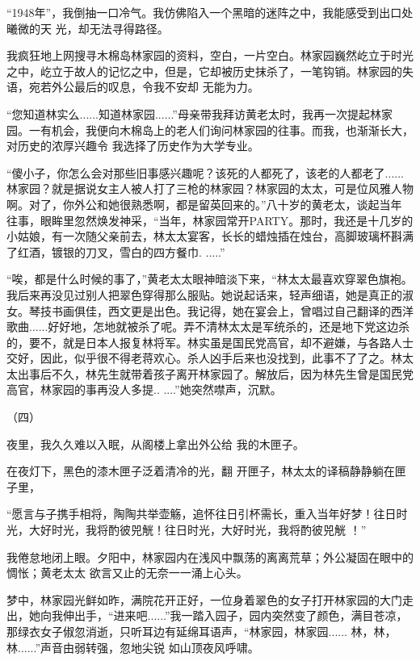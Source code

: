 \documentclass{article}
\begin{document}
\newpage

“1948年”，我倒抽一口冷气。我仿佛陷入一个黑暗的迷阵之中，我能感受到出口处曦微的天
光，却无法寻得路径。 

我疯狂地上网搜寻木棉岛林家园的资料，空白，一片空白。林家园巍然屹立于时光之中，屹立于故人的记忆之中，但是，它却被历史抹杀了，一笔钩销。林家园的失语，宛若外公最后的叹息，令我不安却
无能为力。 

“您知道林实么......知道林家园......”母亲带我拜访黄老太时，我再一次提起林家园。一有机会，我便向木棉岛上的老人们询问林家园的往事。而我，也渐渐长大，对历史的浓厚兴趣令
我选择了历史作为大学专业。 

“傻小子，你怎么会对那些旧事感兴趣呢？该死的人都死了，该老的人都老了......林家园？就是据说女主人被人打了三枪的林家园？林家园的太太，可是位风雅人物啊。对了，你外公和她很熟悉啊，都是留英回来的。”八十岁的黄老太，谈起当年
\newpage
往事，眼眸里忽然焕发神采，“当年，林家园常开PARTY。那时，我还是十几岁的小姑娘，有一次随父亲前去，林太太宴客，长长的蜡烛插在烛台，高脚玻璃杯斟满了红酒，镀银的刀叉，雪白的四方餐巾.
.....” 

“唉，都是什么时候的事了，”黄老太太眼神暗淡下来，“林太太最喜欢穿翠色旗袍。我后来再没见过别人把翠色穿得那么服贴。她说起话来，轻声细语，她是真正的淑女。琴技书画俱佳，西文更是出色。我记得，她在宴会上，曾唱过自己翻译的西洋歌曲......好好地，怎地就被杀了呢。弄不清林太太是军统杀的，还是地下党这边杀的，要不，就是日本人报复林将军。林实虽是国民党高官，却不避嫌，与各路人士交好，因此，似乎很不得老蒋欢心。杀人凶手后来也没找到，此事不了了之。林太太出事后不久，林先生就带着孩子离开林家园了。解放后，因为林先生曾是国民党高官，林家园的事再没人多提..
....”她突然噤声，沉默。 


\newpage

（四） 

夜里，我久久难以入眠，从阁楼上拿出外公给
我的木匣子。 

在夜灯下，黑色的漆木匣子泛着清冷的光，翻
开匣子，林太太的译稿静静躺在匣子里， 

“愿言与子携手相将，陶陶共举壶觞，追怀往日引杯需长，重入当年好梦！往日时光，大好时光，我将酌彼兕觥！往日时光，大好时光，我将酌彼兕觥
！” 

我倦怠地闭上眼。夕阳中，林家园内在浅风中飘荡的离离荒草；外公凝固在眼中的惆怅；黄老太太
欲言又止的无奈一一涌上心头。 

梦中，林家园光鲜如昨，满院花开正好，一位身着翠色的女子打开林家园的大门走出，她向我伸出手，“进来吧......”我一踏入园子，园内突然变了颜色，满目苍凉，那绿衣女子俶忽消逝，只听耳边有延绵耳语声，“林家园，林家园......
\newpage
林，林，林......”声音由弱转强，忽地尖锐
如山顶夜风呼啸。 
\end{document}
